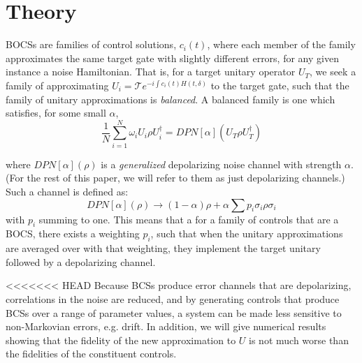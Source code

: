 \documentclass[aps,nofootinbib,pra,notitlepage,twocolumn]{revtex4-1}
\begin{document}
\section{Theory}
 BOCSs are families of control solutions, $c_i(t)$, where each member of the family approximates the same target gate with slightly different errors, for any given instance a noise Hamiltonian. That is, for a target unitary operator $U_T$, we seek a family of approximating $U_i = \mathcal{T}e^{-i\int c_i(t)H(t, \delta)}$ to the target gate, such that the family of unitary approximations is \emph{balanced}. A balanced family is one which satisfies, for some small $\alpha$,
\begin{equation}\label{eq:1}
  \frac{1}{N}\sum_{i=1}^N \omega_i U_i \rho U_i^\dagger = DPN[\alpha]\left(U_T \rho U_T^\dagger \right)
\end{equation}

where $DPN[\alpha](\rho)$ is a \textit{generalized} depolarizing noise channel with strength $\alpha$. (For the rest of this paper, we will refer to them as just depolarizing channels.) Such a channel is defined as:
\begin{equation}\label{eq:2}
  DPN[\alpha](\rho) \rightarrow (1-\alpha)\rho + \alpha\sum p_i \sigma_i\rho\sigma_i
\end{equation}
with $p_i$ summing to one. This means that a for a family of controls that are a BOCS, there exists a weighting $p_i$, such that when the unitary approximations are averaged over with that weighting, they implement the target unitary followed by a depolarizing channel.

<<<<<<< HEAD
Because BCSs produce error channels that are depolarizing, correlations in the noise are reduced, and by generating controls that produce BCSs over a range of parameter values, a system can be made less sensitive to non-Markovian errors, e.g. drift. In addition, we will give numerical results showing that the fidelity of the new approximation to $U$ is not much worse than the fidelities of the constituent controls.
\end{document}
